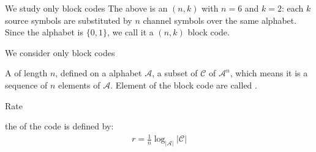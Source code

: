 \begin{parag}{We study only block codes}
    The above is an $\left(n, k\right)$  with $n= 6$ and $k =  2$: each $k$ source symbols are substituted by $n$ channel symbols over the same alphabet.\\
    Since the alphabet is $\{0, 1\}$, we call it a  $\left(n, k\right)$ block code.

    \begin{framedremark}
        We consider only block codes
    \end{framedremark}
    
    \begin{definition}
        A  of length $n$, defined on a alphabet $\mathcal{A}$,   a subset of $\mathcal{C}$ of $\mathcal{A}^n$, which means it is a sequence of $n$ elements of $\mathcal{A}$. Element of the block code are called .
    \end{definition}
    
\end{parag}
\begin{parag}{Rate}
    \begin{definition}
        the  of the code is defined by:
        \begin{align*} r = \frac{1}{n} \log_{\left|\mathcal{A}\right|}\left|\mathcal{C}\right| \end{align*}
    \end{definition}
\end{parag}


